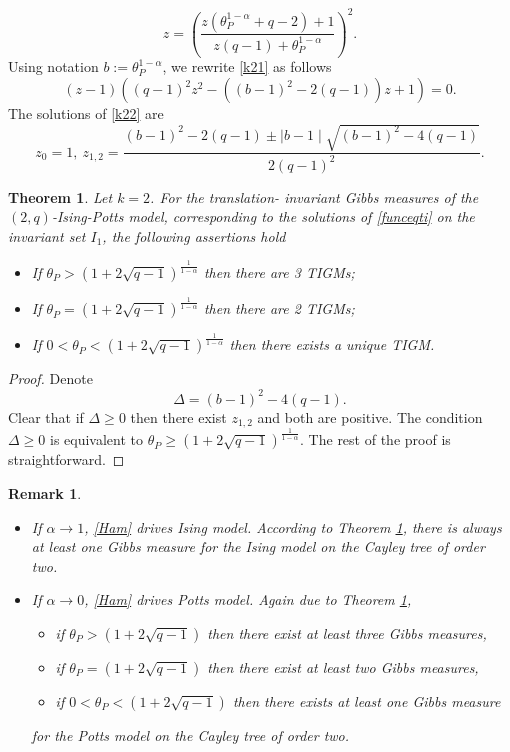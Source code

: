 \documentclass[sn-mathphys]{sn-jnl}%
\theoremstyle{thmstyleone}%
\newtheorem{theorem}{Theorem}%
\theoremstyle{thmstyletwo}%
\newtheorem{remark}{Remark}%
\theoremstyle{thmstylethree}%
\begin{document}
\begin{equation}\label{k21}
z=\left(\frac{z(\theta_{P}^{1-\alpha}+q-2)+1}{z(q-1)+\theta_{P}^{1-\alpha}}\right)^2.
\end{equation}
Using notation $b:=\theta_{P}^{1-\alpha}$, we rewrite \eqref{k21} as follows
\begin{equation}\label{k22}
(z-1)\left((q-1)^2z^2-\left((b-1)^2-2(q-1)\right)z+1\right)=0.
\end{equation}
The solutions of \eqref{k22} are
\begin{equation}\label{k23}
z_0=1,\ z_{1,2}=\frac{(b-1)^2-2(q-1)\pm\mid b-1\mid\sqrt{(b-1)^2-4(q-1)}}{2(q-1)^2}.
\end{equation}
\begin{theorem}\label{k2ti}
Let $k=2$. For the translation- invariant Gibbs measures of the $(2,q)$-Ising-Potts model, corresponding to the solutions of \eqref{funceqti} on the invariant set $I_1$, the following assertions hold
\begin{itemize}
  \item If $\theta_{P}>\left(1+2\sqrt{q-1}\right)^{\frac{1}{1-\alpha}}$ then there are 3 TIGMs;
  \item If $\theta_{P}=\left(1+2\sqrt{q-1}\right)^{\frac{1}{1-\alpha}}$ then there are 2 TIGMs;
  \item If $0<\theta_{P}<\left(1+2\sqrt{q-1}\right)^{\frac{1}{1-\alpha}}$ then there exists a unique TIGM.
\end{itemize}
\end{theorem}
\begin{proof}
Denote $$\Delta=(b-1)^2-4(q-1).$$
Clear that if $\Delta\geq 0$ then there exist $z_{1,2}$ and both are positive. The condition $\Delta\geq 0$ is equivalent to $\theta_{P}\geq\left(1+2\sqrt{q-1}\right)^{\frac{1}{1-\alpha}}.$ The rest of the proof is straightforward.
\end{proof}
\begin{remark}\label{com}
\begin{itemize}
  \item If $\alpha\rightarrow 1$, \eqref{Ham} drives Ising model. According to Theorem \ref{k2ti},  there is always at least one Gibbs measure for the Ising model on the Cayley tree of order two.
  \item If $\alpha\rightarrow 0$, \eqref{Ham} drives Potts model. Again due to Theorem \ref{k2ti},
  \begin{itemize}
    \item if $\theta_{P}>\left(1+2\sqrt{q-1}\right)$ then there exist at least three Gibbs measures,
    \item if $\theta_{P}=\left(1+2\sqrt{q-1}\right)$ then there exist at least two Gibbs measures,
    \item if $0<\theta_{P}<\left(1+2\sqrt{q-1}\right)$ then there exists at least one Gibbs measure
  \end{itemize}
for the Potts model on the Cayley tree of order two.
\end{itemize}
 \end{remark}
\end{document}
